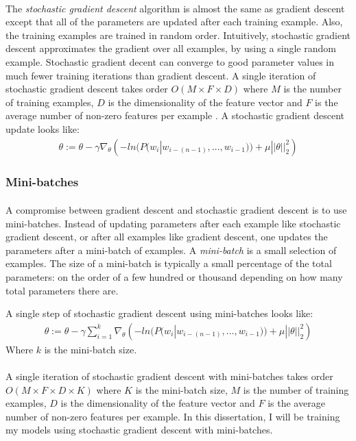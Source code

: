 \paragraph{}
The \emph{stochastic gradient descent} algorithm is almost the same as gradient descent except that all of the parameters are updated after each training example. Also, the training examples are trained in random order. Intuitively, stochastic gradient descent approximates the gradient over all examples, by using a single random example. Stochastic gradient decent can converge to good parameter values in much fewer training iterations than gradient descent. A single iteration of stochastic gradient descent takes order $O(M\times F \times D)$ where $M$ is the number of training examples, $D$ is the dimensionality of the feature vector and $F$ is the average number of non-zero features per example \cite{Elkan2013}. 
A stochastic gradient descent update looks like:
\begin{align}
\theta := \theta - \gamma \nabla_\theta \left( -ln(P(w_i | w_{i-(n-1)},\dots, w_{i-1})) +  \mu ||\theta||^2_2 \right)
\end{align}
\subsubsection{Mini-batches}
\paragraph{}
A compromise between gradient descent and stochastic gradient descent is to use mini-batches. Instead of updating parameters after each example like stochastic gradient descent, or after all examples like gradient descent, one updates the parameters after a mini-batch of examples. A \emph{mini-batch} is a small selection of examples. The size of a mini-batch is typically a small percentage of the total parameters: on the order of a few hundred or thousand depending on how many total parameters there are.


A single step of stochastic gradient descent using mini-batches looks like:
\begin{align}
\theta := \theta - \gamma  \sum_{i=1}^{k} \nabla_\theta \left( -ln(P(w_i | w_{i-(n-1)},\dots, w_{i-1})) +  \mu ||\theta||^2_2 \right)
\end{align}
Where $k$ is the mini-batch size.
\paragraph{}
A single iteration of stochastic gradient descent with mini-batches takes order $O(M\times F \times D\times K)$ where $K$ is the mini-batch size, $M$ is the number of training examples, $D$ is the dimensionality of the feature vector and $F$ is the average number of non-zero features per example. In this dissertation, I will be training my models using stochastic gradient descent with mini-batches.


